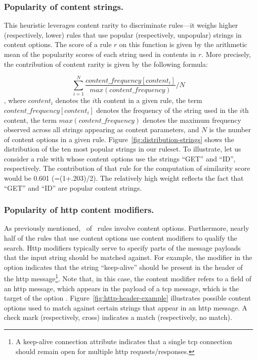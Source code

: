 \documentclass[sigconf,review, anonymous]{acmart}
\begin{document}
\subsubsection{Popularity of content strings.} 
This heuristic leverages content rarity to discriminate rules---it
weighs higher (respectively, lower) rules that use popular
(respectively, unpopular) strings in content options. The score of a
rule $r$ on this function is given by the arithmetic mean of the
popularity scores of each string used in contents in $r$. More
precisely, the contribution of content rarity is given by the
following formula:

{\small
\vspace{-1.5ex}
\[\sum_{i=1}^{N}\frac{\mathit{content\_frequency[content_i]}}{\mathit{max(content\_frequency)}}/N\]
\vspace{-0.5ex}
}
\noindent
, where $\mathit{content_i}$ denotes the $i$th content in a given
rule, the term $\mathit{content\_frequency[\mathit{content_i}]}$
denotes the frequency of the string used in the $i$th content, the
term $\mathit{max(content\_frequency)}$ denotes the maximum frequency
observed across all strings appearing as content parameters, and $N$
is the number of content options in a given
rule. Figure~\ref{fig:distribution-strings} shows the distribution of
the ten most popular strings in our ruleset. To illustrate, let us
consider a rule with whose content options use the strings ``GET'' and
``ID'', respectively. The contribution of that rule for the
computation of similarity score would be 0.601 (=(1+.203)/2). The
relatively high weight reflects the fact that ``GET'' and ``ID'' are
popular content strings.

\subsubsection{\label{sec:popularity-content-modifiers}Popularity of http content modifiers.} As previously
mentioned, \percRulesWithContent\ of \suri\ rules involve content
options. Furthermore, nearly half of the rules that use content
options use content modifiers to qualify the search. Http modifiers
typically serve to specify parts of the message payloads that the
input string should be matched against. For example, the modifier
 in the option  indicates that the string ``keep-alive'' should be
present in the header of the http message\footnote{A keep-alive
  connection attribute indicates that a single tcp connection should
  remain open for multiple http requests/responses.}. Note that, in
this case, the content modifier refers to a field of an http message,
which appears in the payload of a tcp message, which is the target of
the option . Figure~\ref{fig:http-header-example}
illustrates possible content options used to match against certain
strings that appear in an http message. A check mark (respectively,
cross) indicates a match (respectively, no match).
\end{document}
